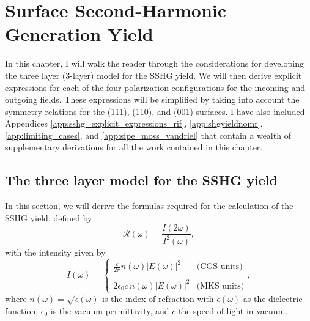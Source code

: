 \chapter{Surface Second-Harmonic Generation Yield}\label{chap:sshgyield}
\partialtoc

In this chapter, I will walk the reader through the considerations for
developing the three layer (3-layer) model for the SSHG yield. We will then
derive explicit expressions for each of the four polarization configurations for
the incoming and outgoing fields. These expressions will be simplified by taking
into account the symmetry relations for the (111), (110), and (001) surfaces. I
have also included Appendices \ref{app:sshg_explicit_expressions_rif},
\ref{app:shgyieldnomr}, \ref{app:limiting_cases}, and
\ref{app:sipe_moss_vandriel} that contain a wealth of supplementary derivations
for all the work contained in this chapter.



\section{The three layer model for the SSHG yield}\label{sec:3layersshg}

In this section, we will derive the formulas required for the calculation of the
SSHG yield, defined by
\begin{equation}\label{eq:rintensities}
\mathcal{R}(\omega)=\frac{I(2\omega)}{I^2(\omega)},
\end{equation}
with the intensity given by \cite{boyd, sutherland}
\begin{equation}\label{eq:intensity}
I(\omega)=
\left\{
\begin{array}{cc}
\frac{c}{2\pi}n(\omega)|E(\omega)|^{2} & \text{(CGS units)} \\\\
2\epsilon_{0}c\, n(\omega)|E(\omega)|^{2} & \text{(MKS units)}
\end{array}
\right.,
\end{equation}
where $n(\omega)=\sqrt{\epsilon(\omega)}$ is the index of refraction with
$\epsilon(\omega)$ as the dielectric function, $\epsilon_{0}$ is the vacuum
permittivity, and $c$ the speed of light in vacuum.

